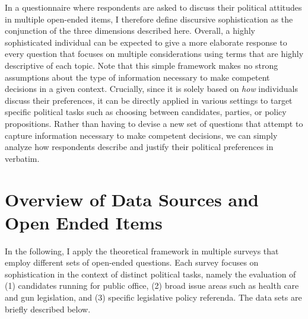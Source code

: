 In a questionnaire where respondents are asked to discuss their political attitudes in multiple open-ended items, I therefore define discursive sophistication as the conjunction of the three dimensions described here. Overall, a highly sophisticated individual can be expected to give a more elaborate response to every question that focuses on multiple considerations using terms that are highly descriptive of each topic. Note that this simple framework makes no strong assumptions about the type of information necessary to make competent decisions in a given context. Crucially, since it is solely based on \textit{how} individuals discuss their preferences, it can be directly applied in various settings to target specific political tasks such as choosing between candidates, parties, or policy propositions. Rather than having to devise a new set of questions that attempt to capture information necessary to make competent decisions, we can simply analyze how respondents describe and justify their political preferences in verbatim.


\section*{Overview of Data Sources and Open Ended Items}

In the following, I apply the theoretical framework in multiple surveys that employ different sets of open-ended questions. Each survey focuses on sophistication in the context of distinct political tasks, namely the evaluation of (1) candidates running for public office, (2) broad issue areas such as health care and gun legislation, and (3) specific legislative policy referenda. The data sets are briefly described below.


